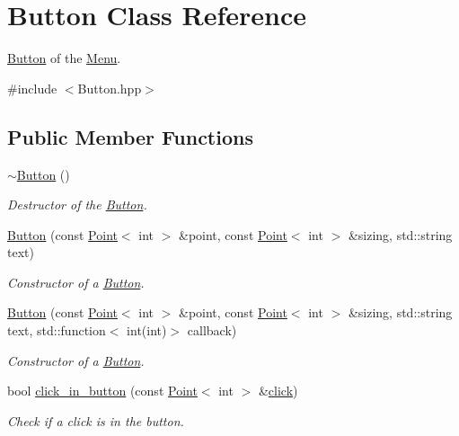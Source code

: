 \hypertarget{classButton}{}\section{Button Class Reference}
\label{classButton}


\hyperlink{classButton}{Button} of the \hyperlink{classMenu}{Menu}.  




{\ttfamily \#include $<$Button.\+hpp$>$}

\subsection*{Public Member Functions}
\begin{DoxyCompactItemize}
\item 
\mbox{\label{classButton_a2a001eb9c3cc8ae54768a850dd345002}} 
\hyperlink{classButton_a2a001eb9c3cc8ae54768a850dd345002}{$\sim$\+Button} ()
\begin{DoxyCompactList}\small\item\em Destructor of the \hyperlink{classButton}{Button}. \end{DoxyCompactList}\item 
\hyperlink{classButton_aaa8e2182b5ddda43df9a959815ea08bc}{Button} (const \hyperlink{classPoint}{Point}$<$ int $>$ \&point, const \hyperlink{classPoint}{Point}$<$ int $>$ \&sizing, std\+::string text)
\begin{DoxyCompactList}\small\item\em Constructor of a \hyperlink{classButton}{Button}. \end{DoxyCompactList}\item 
\hyperlink{classButton_a1ddbd1d3b8b32c2ab1367f4b5c51d7d3}{Button} (const \hyperlink{classPoint}{Point}$<$ int $>$ \&point, const \hyperlink{classPoint}{Point}$<$ int $>$ \&sizing, std\+::string text, std\+::function$<$ int(int)$>$ callback)
\begin{DoxyCompactList}\small\item\em Constructor of a \hyperlink{classButton}{Button}. \end{DoxyCompactList}\item 
bool \hyperlink{classButton_acf7ec691fccf7fc66863a6bb24d31ce5}{click\+\_\+in\+\_\+button} (const \hyperlink{classPoint}{Point}$<$ int $>$ \&\hyperlink{classButton_af6a02022f77e1809a90cb6159c1a1536}{click})
\begin{DoxyCompactList}\small\item\em Check if a click is in the button. \end{DoxyCompactList}\item 

\end{DoxyCompactItemize}
